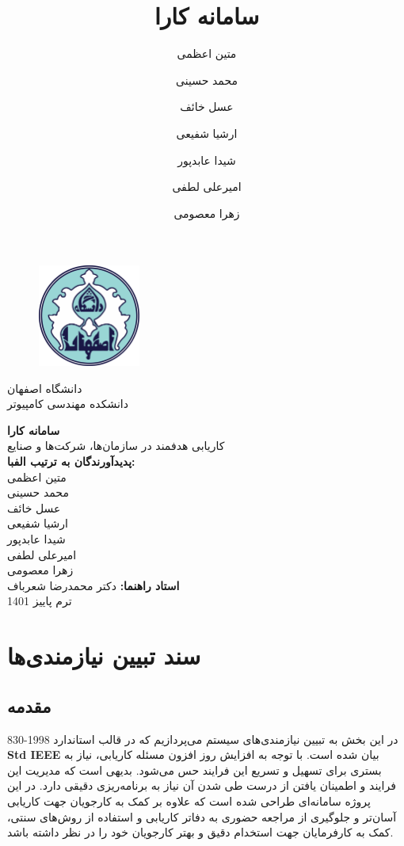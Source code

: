 \documentclass[12pt]{article}
\author{متین اعظمی}
\author{محمد حسینی}
\author{عسل خائف}
\author{ارشیا شفیعی}
\author{شیدا عابدپور}
\author{امیرعلی لطفی}
\author{زهرا معصومی}
\title{سامانه کارا}
\begin{document}
	\begin{figure}
		\centering
		\includegraphics[width=0.3\textwidth]{files/logo}
	\end{figure}
	\begin{center}
		دانشگاه اصفهان\\
		دانشکده مهندسی کامپیوتر
		\vspace{2\baselineskip}

		{\Huge \textbf{سامانه کارا}}\\

		\vspace{1\baselineskip}
		کاریابی هدفمند در سازمان‌ها، شرکت‌ها و صنایع\\
		\vspace{2\baselineskip}
		\textbf{پدیدآورندگان به ترتیب الفبا:}\\
		متین اعظمی\\
		محمد حسینی\\
		عسل خائف\\
		ارشیا شفیعی\\
		شیدا عابدپور\\
		امیرعلی لطفی\\
		زهرا معصومی\\

		\vspace{1\baselineskip}
		{\textbf{استاد راهنما:}}
		 دکتر محمدرضا شعرباف\\
		\vspace{2\baselineskip}
		ترم پاییز 1401

	\end{center}
	\newpage
	\tableofcontents
	\newpage

	\section{سند تبیین نیازمندی‌ها}

	\subsection{مقدمه}
	در این بخش به تبیین نیازمندی‌های سیستم می‌پردازیم که در قالب استاندارد 1998-830
	\textbf{Std IEEE}
	 بیان شده است.
	با توجه به افزایش روز افزون مسئله کاریابی، نیاز به بستری برای تسهیل و تسریع این فرایند حس می‌شود. بدیهی است که مدیریت این فرایند و اطمینان یافتن از درست طی شدن آن نیاز به برنامه‌ریزی دقیقی دارد.
	در این پروژه سامانه‌ای طراحی شده است که علاوه بر کمک به کارجویان جهت کاریابی آسان‌تر و جلوگیری از مراجعه حضوری به دفاتر کاریابی و استفاده از روش‌های سنتی، کمک به کارفرمایان جهت استخدام دقیق و بهتر کارجویان خود را در نظر داشته باشد.
\end{document}
